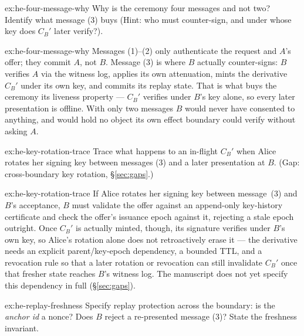 \documentclass[11pt,a4paper]{article}
\theoremstyle{definition}
\theoremstyle{definition}
\theoremstyle{remark}
\begin{document}

\begin{pdexercise}[kind=Check,rating=1]{ex:he-four-message-why}
Why is the ceremony four messages and not two? Identify what message (3)
  buys (Hint: who must counter-sign, and under whose key does $C_B'$ later verify?).
\end{pdexercise}
\begin{pdsolution}{ex:he-four-message-why}
Messages (1)--(2) only authenticate the request and $A$'s offer; they commit
$A$, not $B$. Message (3) is where $B$ actually counter-signs: $B$ verifies $A$
via the witness log, applies its own attenuation, mints the derivative $C_B'$
under its own key, and commits its replay state. That is what buys the ceremony
its liveness property --- $C_B'$ verifies under $B$'s key alone, so every later
presentation is offline. With only two messages $B$ would never have consented
to anything, and would hold no object its own effect boundary could verify
without asking $A$.
\end{pdsolution}
\begin{pdexercise}[kind=Trace,rating=2]{ex:he-key-rotation-trace}
Trace what happens to an in-flight $C_B'$ when Alice rotates her signing key
  between messages (3) and a later presentation at $B$. (Gap: cross-boundary key
  rotation, \S\ref{sec:gaps}.)
\end{pdexercise}
\begin{pdsolution}{ex:he-key-rotation-trace}
If Alice rotates her signing key between message~(3) and $B$'s acceptance,
$B$ must validate the offer against an append-only key-history certificate and
check the offer's issuance epoch against it, rejecting a stale epoch outright.
Once $C_B'$ is actually minted, though, its signature verifies under $B$'s own
key, so Alice's rotation alone does not retroactively erase it --- the
derivative needs an explicit parent/key-epoch dependency, a bounded TTL, and a
revocation rule so that a later rotation or revocation can still invalidate
$C_B'$ once that fresher state reaches $B$'s witness log. The manuscript does not
yet specify this dependency in full (\S\ref{sec:gaps}).
\end{pdsolution}
\begin{pdexercise}[kind=Open,rating=3]{ex:he-replay-freshness}
Specify replay protection across the boundary: is the
  \textit{anchor id} a nonce? Does $B$ reject a re-presented message (3)? State the
  freshness invariant.
\end{pdexercise}
\end{document}
